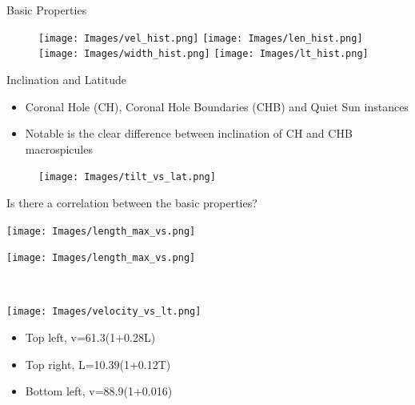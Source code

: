 \documentclass{beamer}
\begin{document}
	\begin{frame}{Basic Properties}
		\begin{figure}
				\texttt{[image: Images/vel\_hist.png]}
				\texttt{[image: Images/len\_hist.png]}\\
				
				\texttt{[image: Images/width\_hist.png]}
				\texttt{[image: Images/lt\_hist.png]}
		\end{figure}
	\end{frame}
	
	\begin{frame}{Inclination and Latitude}
		\begin{itemize}
			\item{Coronal Hole (CH), Coronal Hole Boundaries (CHB) and Quiet Sun instances}
			\item{Notable is the clear difference between inclination of CH and CHB macrospicules}
		\end{itemize}
		\begin{figure}
			\centering
				\texttt{[image: Images/tilt\_vs\_lat.png]}
		\end{figure}
	\end{frame}
	
	
	
	\begin{frame}
		\begin{center}
			Is there a correlation between the basic properties?			
		\end{center}

	\end{frame}
	
	
	
	\begin{frame}
		\begin{minipage}{0.49\textwidth}
			\begin{flushleft}
				\texttt{[image: Images/length\_max\_vs.png]}
			\end{flushleft}
		\end{minipage}
		\begin{minipage}{0.49\textwidth}
			\begin{center}
				\texttt{[image: Images/length\_max\_vs.png]}
			\end{center}
		\end{minipage}\\
		\begin{minipage}{0.49\textwidth}
			\begin{flushright}
			\texttt{[image: Images/velocity\_vs\_lt.png]}
			\end{flushright}
		\end{minipage}
		\begin{minipage}{0.49\textwidth}
			\begin{itemize}
				\small
				\item{Top left, v=61.3(1+0.28L)}
				\item{Top right, L=10.39(1+0.12T)}
				\item{Bottom left, v=88.9(1+0.016)}
			\end{itemize}
		\end{minipage}
	\end{frame}
\end{document}
